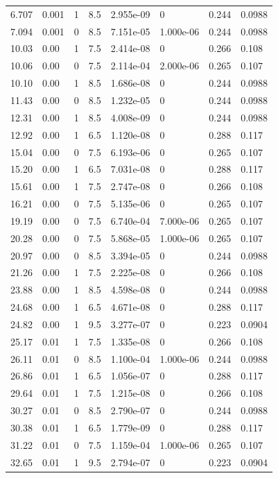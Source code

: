 \documentclass[preview]{standalone}
\begin{document}
{{\begin{tabular}{L{1.2cm}C{1.2cm} C{0.3cm}C{0.5cm} C{1.4cm}C{1.4cm} C{1.4cm}C{1.4cm}}
  6.707  &  0.001  & 1     & 8.5 &  2.955e-09  & 0  & 0.244 &  0.0988   \\ 
  7.094  &  0.001  & 0     & 8.5 &  7.151e-05  & 1.000e-06  & 0.244 &  0.0988   \\ 
  10.03  &  0.00  & 1     & 7.5 &  2.414e-08  & 0  & 0.266 &  0.108   \\ 
  10.06  &  0.00  & 0     & 7.5 &  2.114e-04  & 2.000e-06  & 0.265 &  0.107   \\ 
  10.10  &  0.00  & 1     & 8.5 &  1.686e-08  & 0  & 0.244 &  0.0988   \\ 
  11.43  &  0.00  & 0     & 8.5 &  1.232e-05  & 0  & 0.244 &  0.0988   \\ 
  12.31  &  0.00  & 1     & 8.5 &  4.008e-09  & 0  & 0.244 &  0.0988   \\ 
  12.92  &  0.00  & 1     & 6.5 &  1.120e-08  & 0  & 0.288 &  0.117   \\ 
  15.04  &  0.00  & 0     & 7.5 &  6.193e-06  & 0  & 0.265 &  0.107   \\ 
  15.20  &  0.00  & 1     & 6.5 &  7.031e-08  & 0  & 0.288 &  0.117   \\ 
  15.61  &  0.00  & 1     & 7.5 &  2.747e-08  & 0  & 0.266 &  0.108   \\ 
  16.21  &  0.00  & 0     & 7.5 &  5.135e-06  & 0  & 0.265 &  0.107   \\ 
  19.19  &  0.00  & 0     & 7.5 &  6.740e-04  & 7.000e-06  & 0.265 &  0.107   \\ 
  20.28  &  0.00  & 0     & 7.5 &  5.868e-05  & 1.000e-06  & 0.265 &  0.107   \\ 
  20.97  &  0.00  & 0     & 8.5 &  3.394e-05  & 0  & 0.244 &  0.0988   \\ 
  21.26  &  0.00  & 1     & 7.5 &  2.225e-08  & 0  & 0.266 &  0.108   \\ 
  23.88  &  0.00  & 1     & 8.5 &  4.598e-08  & 0  & 0.244 &  0.0988   \\ 
  24.68  &  0.00  & 1     & 6.5 &  4.671e-08  & 0  & 0.288 &  0.117   \\ 
  24.82  &  0.00  & 1     & 9.5 &  3.277e-07  & 0  & 0.223 &  0.0904   \\ 
  25.17  &  0.01  & 1     & 7.5 &  1.335e-08  & 0  & 0.266 &  0.108   \\ 
  26.11  &  0.01  & 0     & 8.5 &  1.100e-04  & 1.000e-06  & 0.244 &  0.0988   \\ 
  26.86  &  0.01  & 1     & 6.5 &  1.056e-07  & 0  & 0.288 &  0.117   \\ 
  29.64  &  0.01  & 1     & 7.5 &  1.215e-08  & 0  & 0.266 &  0.108   \\ 
  30.27  &  0.01  & 0     & 8.5 &  2.790e-07  & 0  & 0.244 &  0.0988   \\ 
  30.38  &  0.01  & 1     & 6.5 &  1.779e-09  & 0  & 0.288 &  0.117   \\ 
  31.22  &  0.01  & 0     & 7.5 &  1.159e-04  & 1.000e-06  & 0.265 &  0.107   \\ 
  32.65  &  0.01  & 1     & 9.5 &  2.794e-07  & 0  & 0.223 &  0.0904   \\ 
\hline 
\end{tabular} 

}}
\end{document}
